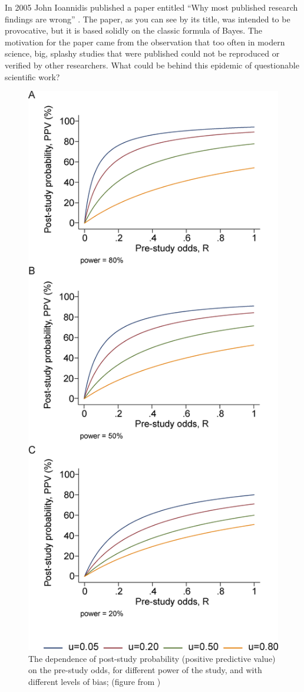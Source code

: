 \documentclass[
]{book}
\theoremstyle{definition}
\theoremstyle{definition}
\theoremstyle{definition}
\theoremstyle{remark}
\begin{document}
In 2005 John Ioannidis published a paper entitled ``Why most published research findings are wrong'' \citep{ioannidis_why_2005}. The paper, as you can see by its title, was intended to be provocative, but it is based solidly on the classic formula of Bayes. The motivation for the paper came from the observation that too often in modern science, big, splashy studies that were published could not be reproduced or verified by other researchers. What could be behind this epidemic of questionable scientific work?

\begin{figure}
\centering
\includegraphics{ch7/ioannidis_bayes.png}
\caption{The dependence of post-study probability (positive predictive value) on the pre-study odds, for different power of the study, and with different levels of bias; (figure from \citep{ioannidis_why_2005})}
\end{figure}
\end{document}
